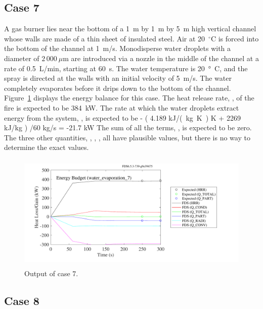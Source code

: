 \documentclass[11pt]{book}
\begin{document}
\FloatBarrier

\subsection{Case 7}
\label{water_evaporation_7}

A gas burner lies near the bottom of a 1~m by 1~m by 5~m high vertical channel whose walls are made of a thin sheet of insulated steel. Air at 20~$^\circ$C is forced into the bottom of the channel at 1~m/s. Monodisperse water droplets with a diameter of $2\,000~\mu$m are introduced via a nozzle in the middle of the channel at a rate of 0.5~L/min, starting at 60~s. The water temperature is 20~\si{\degree C}, and the spray is directed at the walls with an initial velocity of 5~m/s. The water completely evaporates before it drips down to the bottom of the channel. Figure~\ref{water_evaporation_7_plot} displays the energy balance for this case. The heat release rate, , of the fire is expected to be 384~kW. The rate at which the water droplets extract energy from the system, , is expected to be
\be - \left( 4.189 \; \hbox{\si{kJ/(kg.K)}}  \; \hbox{K} + 2269 \; \hbox{kJ/kg} \right) /60 \; \hbox{kg/s} = -21.7 \; \hbox{kW} \ee
The sum of all the terms, , is expected to be zero. The three other quantities, , , , all have plausible values, but there is no way to determine the exact values.

\begin{figure}[h!]
\centering
\includegraphics[height=2.2in]{SCRIPT_FIGURES/water_evaporation_7}
\caption[Sample case ]{Output of  case 7.}
\label{water_evaporation_7_plot}
\end{figure}

\FloatBarrier

\subsection{Case 8}
\label{water_evaporation_8}
\end{document}
